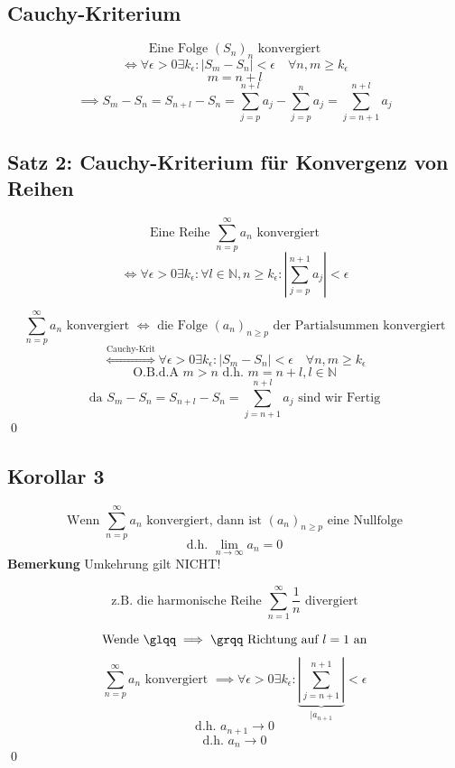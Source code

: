 \documentclass[fleqn]{scrbook}
\newcommand{\mqq}[1]{\text{\glqq} #1\text{\grqq}}
\newcommand{\N}{\mathbb{N}}
\renewenvironment{proof}{{\bfseries Beweis }}{\qed}
\begin{document}
\subsection{Cauchy-Kriterium}

\[\text{Eine Folge } (S_n)_n \text{ konvergiert} \]
\[\Longleftrightarrow \forall \epsilon > 0 \exists k_\epsilon : |S_m -S_n|<\epsilon \quad \forall n,m \geq k_\epsilon\] 
\[m=n+l\]
\[\implies S_m - S_n = S_{n+l} - S_n = \sum_{j=p}^{n+l} a_j -\sum_{j=p}^n a_j = \sum_{j=n+1}^{n+l} a_j\]

\subsection{Satz 2: Cauchy-Kriterium für Konvergenz von Reihen}

\[\text{Eine Reihe } \sum_{n=p}^\infty a_n \text{ konvergiert} \]
\[\Longleftrightarrow \forall \epsilon > 0 \exists k_\epsilon : \forall l \in \N, n \geq k_\epsilon : \left|\sum_{j=p}^{n+1} a_j\right|<\epsilon\]

\begin{proof}
  \[\sum_{n=p}^\infty a_n \text{ konvergiert } \Longleftrightarrow \text{ die Folge } (a_n)_{n\geq p} \text{ der Partialsummen konvergiert}\]
  \[\stackrel{\text{Cauchy-Krit}}{\Longleftrightarrow} \forall \epsilon > 0 \exists k_\epsilon : | S_m -S_n | < \epsilon \quad \forall n,m \geq k_\epsilon\]
  \[\text{O.B.d.A } m>n \text{ d.h. } m=n+l,l\in \N\]
  \[\text{da } S_m-S_n = S_{n+l}- S_n = \sum_{j=n+1}^{n+l} a_j \text{ sind wir Fertig}\]
\end{proof}

\subsection{Korollar 3}

\[\text{Wenn } \sum_{n=p}^\infty a_n \text{ konvergiert, dann ist } (a_n)_{n \geq p} \text{ eine Nullfolge} \]
\[\text{d.h. } \lim_{n\to \infty} a_n = 0\]
\textbf{Bemerkung}
Umkehrung gilt NICHT!

\[\text{z.B. die harmonische Reihe } \sum_{n=1}^\infty \frac{1}{n} \text{ divergiert}\]

\begin{proof}
  \[\text{Wende } \mqq{\implies} \text{ Richtung auf } l=1 \text{ an}\]
  \[\sum_{n=p}^\infty a_n \text{ konvergiert } \implies \forall \epsilon > 0 \exists k_\epsilon : \underbrace{\left| \sum_{j=n+1}^{n+1} \right|}_{|a_{n+1}}<\epsilon\]
  \[\text{d.h. } a_{n+1} \to 0\]
  \[\text{d.h. } a_{n} \to 0\]
\end{proof}
\end{document}

